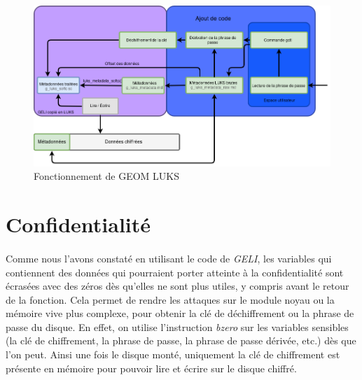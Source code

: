 \begin{figure}[h]
  \centering
  \includegraphics[width=\linewidth]{choix_developpement/utilisation_metadonnee_luks_2.png}
  \caption{\label{fig:fonctionnement}Fonctionnement de GEOM LUKS}
\end{figure}

\section{Confidentialité}
\paragraph{}
Comme nous l'avons constaté en utilisant le code de {\em GELI}, les variables
qui contiennent des données qui pourraient porter atteinte à la confidentialité
sont écrasées avec des zéros dès qu'elles ne sont plus utiles, y compris avant
le retour de la fonction. Cela permet de rendre les attaques sur le module
noyau ou la mémoire vive plus complexe, pour obtenir la clé de déchiffrement ou
la phrase de passe du disque. En effet, on utilise l'instruction {\em bzero}
sur les variables sensibles (la clé de chiffrement, la phrase de passe, la
phrase de passe dérivée, etc.) dès que l'on peut. Ainsi une fois le disque
monté, uniquement la clé de chiffrement est présente en mémoire pour pouvoir
lire et écrire sur le disque chiffré.